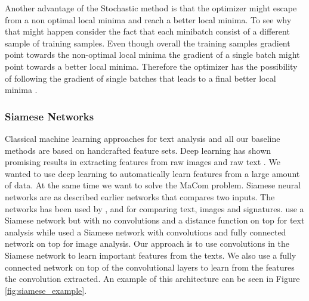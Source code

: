 Another advantage of the Stochastic method is that the optimizer might escape
from a non optimal local minima and reach a better local minima. To see why that
might happen consider the fact that each minibatch consist of a different sample
of training samples. Even though overall the training samples gradient point
towards the non-optimal local minima the gradient of a single batch might point
towards a better local minima. Therefore the optimizer has the possibility of
following the gradient of single batches that leads to a final better local
minima \cite{Bishop}.


\subsubsection{Siamese Networks}

Classical machine learning approaches for text analysis and all our baseline
methods are based on handcrafted feature sets. Deep learning has shown
promising results in extracting features from raw images and raw text
\cite{hongxiaosunyuan}. We wanted to use deep learning to automatically learn
features from a large amount of data. At the same time we want to solve the
MaCom problem. Siamese neural networks are as described earlier networks that
compares two inputs. The networks has been used by \cite{Koch2015SiameseNN},
\cite{NIPS1993_769} and \cite{qian:2018} for comparing text, images and
signatures. \cite{qian:2018} use a Siamese network but with no convolutions and
a distance function on top for text analysis while \cite{Koch2015SiameseNN}
used a Siamese network with convolutions and fully connected network on top
for image analysis. Our approach is to use convolutions in the Siamese network
to learn important features from the texts. We also use a fully connected
network on top of the convolutional layers to learn from the features the
convolution extracted. An example of this architecture can be seen in Figure
\ref{fig:siamese_example}.

